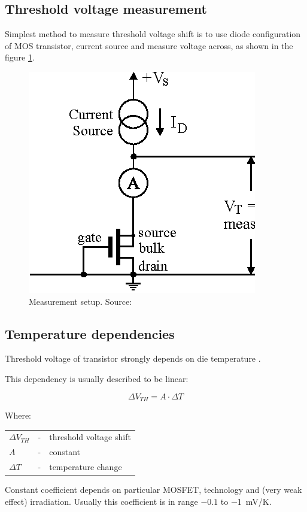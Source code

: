     \subsection{Threshold voltage measurement}
        Simplest method to measure threshold voltage shift is to use diode configuration of MOS transistor, current source and measure voltage across, as shown in the figure \ref{MOS_measurement_setup}.

        \begin{figure}[H]
            \centering
            \includegraphics[width=0.3\paperwidth]{img/03/Vth-measurement-setup.eps}
            \caption{Measurement setup. Source: \cite{pMOS_dosimeters_radfets}}
            \label{MOS_measurement_setup}
        \end{figure}

    \subsection{Temperature dependencies}
        Threshold voltage of transistor strongly depends on die temperature \cite{managing_temperature_effects_in_nanoscale_adaptive_systems}.

        This dependency is usually described to be linear:

        $$\Delta V_{TH} = A \cdot \Delta T$$

        Where:

        \begin{tabular}{lcl}
            $\Delta V_{TH}$ & - & threshold voltage shift \\
            $A$ & - & constant \\
            $\Delta T$ & - & temperature change \\
        \end{tabular}
        \bigskip

        Constant coefficient depends on particular MOSFET, technology and (very weak effect) irradiation. Usually this coefficient is in range $-0.1$ to \SI{-1}{\milli\volt/\kelvin}.
